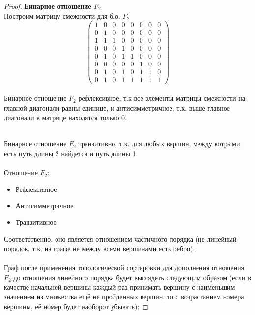 \pagebreak
\begin{proof} \textbf{Бинарное отношение $F_2$}\\
Построим матрицу смежности для б.о. $F_2$
$$ \left( \begin{array}{cccccccc}
		   1 &0 &0 &0 &0 &0 &0 &0 
        \\0 &1 &0 &0 &0 &0 &0 &0
        \\1 &1 &1 &0 &0 &0 &0 &0
        \\0 &0 &0 &1 &0 &0 &0 &0
        \\0 &1 &0 &1 &1 &0 &0 &0
        \\0 &0 &0 &0 &0 &1 &0 &0
        \\0 &1 &0 &1 &0 &1 &1 &0
        \\0 &1 &0 &1 &1 &1 &1 &1 \end{array} \right) $$\\
Бинарное отношение $F_2$ рефлексивное, т.к все элементы матрицы смежности на главной диагонали равны единице, и антисимметричное, т.к. выше главное диагонали в матрице находятся только 0.

\\
Бинарное отношение $F_2$ транзитивно, т.к. для любых вершин, между котрыми есть путь длины 2 найдется и путь длины 1.
\\ \\
Отношение $F_2$:
\begin{itemize}
    \item Рефлексивное
    \item Антисимметричное
    \item Транзитивное
\end{itemize}
Соответственно, оно является отношением частичного порядка (не линейный порядок, т.к. на графе не между всеми вершинами есть ребро).
\\ \\
Граф после применения топологической сортировки для дополнения отношения $F_2$ до отношения линейного порядка будет выглядеть следующим образом (если в качестве начальной вершины каждый раз принимать вершину с наименьшим значением из множества ещё не пройденных вершин, то с возрастанием номера вершины, её номер будет наоборот убывать):


\end{proof}
